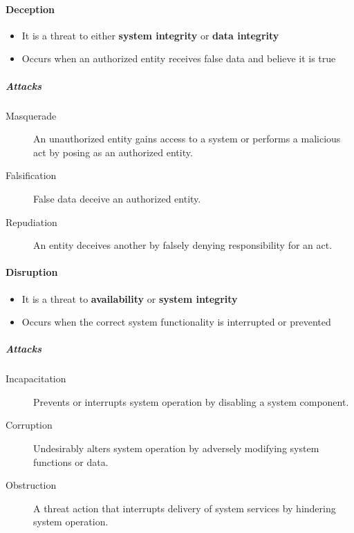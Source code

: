 \documentclass{article}
\begin{document}
                   \paragraph{Deception}
                        \begin{itemize}
                            \item It is a threat to either \textbf{system integrity} or \textbf{data integrity}
                            \item Occurs when an authorized entity receives false data and believe it is true
                        \end{itemize}
                        \subparagraph{Attacks}
                            \begin{description}
                                \item[Masquerade] An unauthorized entity gains access to a system or performs a malicious act by posing as an authorized entity.
                                \item[Falsification] False data deceive an authorized entity.
                                \item[Repudiation]   An entity deceives another by falsely denying responsibility for an act.
                            \end{description}
                    \paragraph{Disruption}
                        \begin{itemize}
                            \item  It is a threat to \textbf{availability} or \textbf{system integrity}
                            \item Occurs when the correct system functionality is interrupted or prevented
                        \end{itemize}
                        \subparagraph{Attacks}
                            \begin{description}
                                \item[Incapacitation]  Prevents or interrupts system operation by disabling a system component.
                                \item[Corruption]  Undesirably alters system operation by adversely modifying system functions or data.
                                \item[Obstruction]  A threat action that interrupts delivery of system services by hindering system operation.
                            \end{description}
\end{document}
